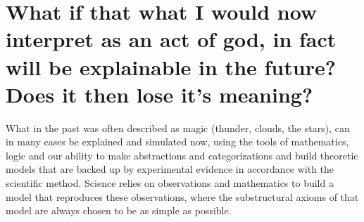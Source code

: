 \documentclass[11pt]{article}
\begin{document}
\section{What if that what I would now interpret as an act of god, in fact will be explainable in the future? Does it then lose it's meaning?}
\label{sec:org43acd08}
What in the past was often described as magic (thunder, clouds, the stars), can in many cases be explained and simulated now, using the tools of mathematics, logic and our ability to make abstractions and categorizations and build theoretic models that are backed up by experimental evidence in accordance with the scientific method. Science relies on observations and mathematics to build a model that reproduces these observations, where the substructural axioms of that model are always chosen to be as simple as possible. 

\cite{elb05}


\end{document}
